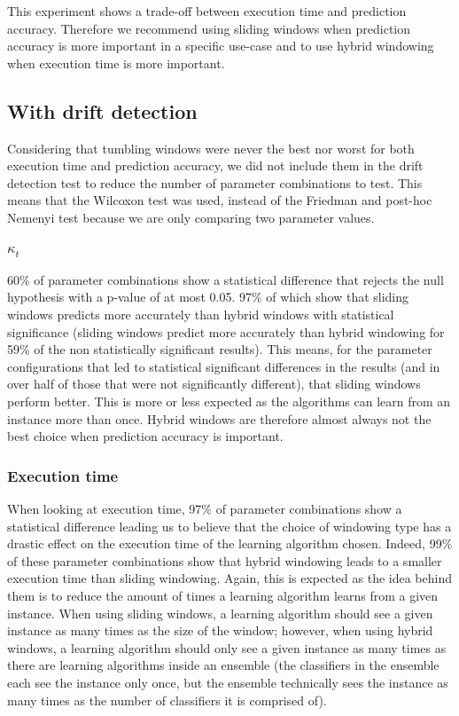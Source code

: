 This experiment shows a trade-off between execution time and prediction accuracy. Therefore we recommend using sliding windows when prediction accuracy is more important in a specific use-case and to use hybrid windowing when execution time is more important.

\subsection{With drift detection}
Considering that tumbling windows were never the best nor worst for both execution time and prediction accuracy, we did not include them in the drift detection test to reduce the number of parameter combinations to test. This means that the Wilcoxon test was used, instead of the Friedman and post-hoc Nemenyi test because we are only comparing two parameter values.

\subsubsection{$\kappa_t$}
60\% of parameter combinations show a statistical difference that rejects the null hypothesis with a p-value of at most 0.05. 97\% of which show that sliding windows predicts more accurately than hybrid windows with statistical significance (sliding windows predict more accurately than hybrid windowing for 59\% of the non statistically significant results). This means, for the parameter configurations that led to statistical significant differences in the results (and in over half of those that were not significantly different), that sliding windows perform better. This is more or less expected as the algorithms can learn from an instance more than once. Hybrid windows are therefore almost always not the best choice when prediction accuracy is important.

\subsubsection{Execution time}
When looking at execution time, 97\% of parameter combinations show a statistical difference leading us to believe that the choice of windowing type has a drastic effect on the execution time of the learning algorithm chosen. Indeed, 99\% of these parameter combinations show that hybrid windowing leads to a smaller execution time than sliding windowing. Again, this is expected as the idea behind them is to reduce the amount of times a learning algorithm learns from a given instance. When using sliding windows, a learning algorithm should see a given instance as many times as the size of the window; however, when using hybrid windows, a learning algorithm should only see a given instance as many times as there are learning algorithms inside an ensemble (the classifiers in the ensemble each see the instance only once, but the ensemble technically sees the instance as many times as the number of classifiers it is comprised of).


